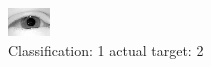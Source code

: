 \begin{figure}[h!]
\begin{center}
\includegraphics[width=0.60\columnwidth]{figures/ID2303_class_1_target_2.png}
\end{center}
\caption{ Classification: 1 actual target: 2}
\label{fig:ID2303_class_1_target_2}
\end{figure}
